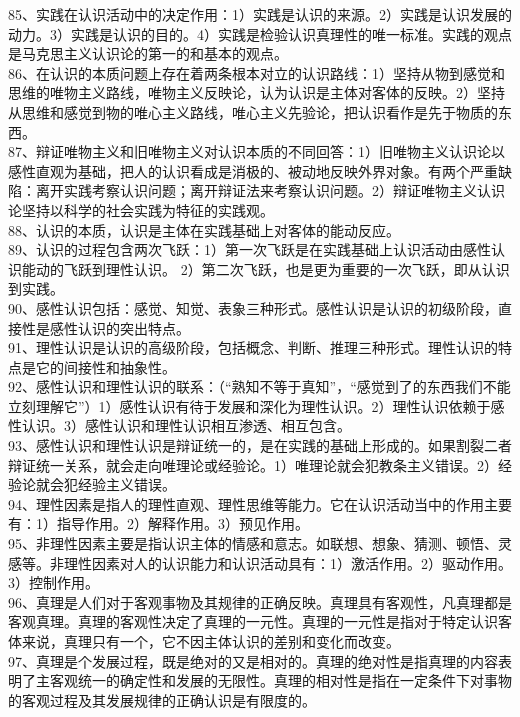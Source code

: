 \documentclass[a4paper,fleqn]{article}
\begin{document}
85、实践在认识活动中的决定作用：1）实践是认识的来源。2）实践是认识发展的动力。3）实践是认识的目的。4）实践是检验认识真理性的唯一标准。实践的观点是马克思主义认识论的第一的和基本的观点。 \\
86、在认识的本质问题上存在着两条根本对立的认识路线：1）坚持从物到感觉和思维的唯物主义路线，唯物主义反映论，认为认识是主体对客体的反映。2）坚持从思维和感觉到物的唯心主义路线，唯心主义先验论，把认识看作是先于物质的东西。 \\
87、辩证唯物主义和旧唯物主义对认识本质的不同回答：1）旧唯物主义认识论以感性直观为基础，把人的认识看成是消极的、被动地反映外界对象。有两个严重缺陷：离开实践考察认识问题；离开辩证法来考察认识问题。2）辩证唯物主义认识论坚持以科学的社会实践为特征的实践观。 \\
88、认识的本质，认识是主体在实践基础上对客体的能动反应。 \\
89、认识的过程包含两次飞跃：1）第一次飞跃是在实践基础上认识活动由感性认识能动的飞跃到理性认识。 2）第二次飞跃，也是更为重要的一次飞跃，即从认识到实践。 \\
90、感性认识包括：感觉、知觉、表象三种形式。感性认识是认识的初级阶段，直接性是感性认识的突出特点。 \\
91、理性认识是认识的高级阶段，包括概念、判断、推理三种形式。理性认识的特点是它的间接性和抽象性。 \\
92、感性认识和理性认识的联系：（“熟知不等于真知”，“感觉到了的东西我们不能立刻理解它”）1）感性认识有待于发展和深化为理性认识。2）理性认识依赖于感性认识。3）感性认识和理性认识相互渗透、相互包含。 \\
93、感性认识和理性认识是辩证统一的，是在实践的基础上形成的。如果割裂二者辩证统一关系，就会走向唯理论或经验论。1）唯理论就会犯教条主义错误。2）经验论就会犯经验主义错误。 \\
94、理性因素是指人的理性直观、理性思维等能力。它在认识活动当中的作用主要有：1）指导作用。2）解释作用。3）预见作用。 \\
95、非理性因素主要是指认识主体的情感和意志。如联想、想象、猜测、顿悟、灵感等。非理性因素对人的认识能力和认识活动具有：1）激活作用。2）驱动作用。3）控制作用。 \\
96、真理是人们对于客观事物及其规律的正确反映。真理具有客观性，凡真理都是客观真理。真理的客观性决定了真理的一元性。真理的一元性是指对于特定认识客体来说，真理只有一个，它不因主体认识的差别和变化而改变。 \\
97、真理是个发展过程，既是绝对的又是相对的。真理的绝对性是指真理的内容表明了主客观统一的确定性和发展的无限性。真理的相对性是指在一定条件下对事物的客观过程及其发展规律的正确认识是有限度的。 \\
\end{document}
